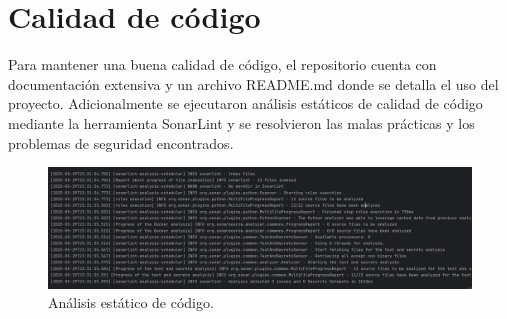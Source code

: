 
\chapter{Calidad de código} %

\label{Cobertura y calidad de código}

Para mantener una buena calidad de código, el repositorio cuenta con documentación extensiva y un archivo README.md donde se detalla el uso del proyecto. Adicionalmente se ejecutaron análisis estáticos de calidad de código mediante la herramienta SonarLint y se resolvieron las malas prácticas y los problemas de seguridad encontrados.

\begin{figure}[htbp]
	\centering
	\includegraphics[width=\textwidth]{./Figures/sonar.png}
	\caption{Análisis estático de código.}
	\label{fig:sonar}
\end{figure}

